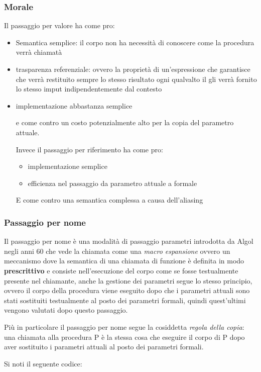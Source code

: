 \subsubsection{Morale}
Il passaggio per valore ha come pro:
\begin{itemize}
    \item Semantica semplice: il corpo non ha necessità di conoscere come la procedura verrà chiamatà
    \item trasparenza referenziale: ovvero la proprietà di un'espressione che garantisce che verrà restituito sempre lo stesso risultato ogni qualvalto il gli verrà fornito lo stesso imput indipendentemente dal contesto
    \item implementazione abbastanza semplice
    
e come contro un costo potenzialmente alto per la copia del parametro attuale.

Invece il passaggio per riferimento ha come pro:
\begin{itemize}
    \item implementazione semplice
    \item efficienza nel passaggio da parametro attuale a formale
\end{itemize}

E come contro una semantica complessa a causa dell'aliasing
\end{itemize}
\subsubsection{Passaggio per nome}

Il passaggio per nome è una modalità di passaggio parametri introdotta da Algol negli anni 60 che vede la chiamata come una \textit{macro espansione} ovvero un meccanismo dove la semantica di una chiamata di funzione è definita in modo \textbf{prescrittivo} e consiste nell'esecuzione del corpo come se fosse testualmente presente nel chiamante, anche la gestione dei parametri segue lo stesso principio, ovvero il corpo della procedura viene eseguito dopo che i parametri attuali sono stati sostituiti testualmente al posto dei parametri formali, quindi quest'ultimi vengono valutati dopo questo passaggio. 

Più in particolare il passaggio per nome segue la cosiddetta \textit{regola della copia}: una chiamata alla procedura P è la stessa cosa che eseguire il corpo di P dopo aver sostituito i parametri attuali al posto dei parametri formali.

Si noti il seguente codice:

